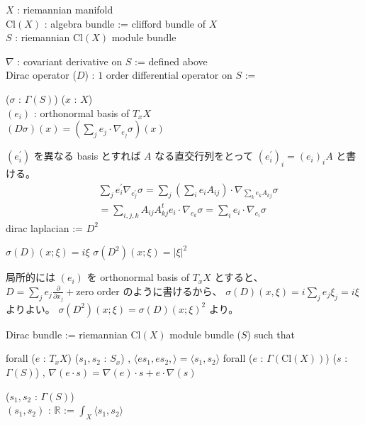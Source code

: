 \begin{When}
\itemwhen
  \Fix \(X\) : riemannian manifold \\
  \Let \(\text{Cl}(X)\) : algebra bundle := clifford bundle of \(X\) \\
  \Fix \(S\) : riemannian \(\text{Cl}(X)\) module bundle \\
\end{When}

\begin{Definition}
\itemdefi
  \Let \(\nabla\) : covariant derivative on \(S\) := defined above \\
  \Define Dirac operator (\(D\)) : \(1\) order differential operator on \(S\) :=
  \begin{indentblock}
    \For (\(\sigma\) : \(\Gamma(S)\)) (\(x\) : \(X\)) \\
    \Take \((e_i)\) : orthonormal basis of \(T_x X\) \\
    \Define \((D \sigma)(x) = (\sum_j e_j \cdot \nabla_{e_j} \sigma)(x)\)
  \end{indentblock}
\itemprof
  \((e^{\prime}_i)\) を異なる basis とすれば \(A\) なる直交行列をとって \((e^{\prime}_i)_i = (e_i)_i A\) と書ける。
  \begin{align*}
    & \sum_j e^{\prime}_i \nabla_{e^{\prime}_j} \sigma = \sum_j (\sum_i e_i A_{ij}) \cdot \nabla_{\sum_k e_k A_{kj}} \sigma \\
    &= \sum_{i,j,k} A_{ij} A^t_{kj} e_i \cdot \nabla_{e_k} \sigma = \sum_{i} e_i \cdot \nabla_{e_i} \sigma 
  \end{align*}
\itemdefi
  dirac laplacian := \(D^2\)
\end{Definition}

\begin{Theorem}
\itemprop
  \(\sigma(D)(x ; \xi) = i \xi\)
\itemprop
  \(\sigma(D^2)(x ; \xi) = \left| \xi \right| ^2\)
\end{Theorem}

\begin{Proof}
\itemprof
  局所的には \((e_i)\) を orthonormal basis of \(T_x X\) とすると、 \(D = \sum_j e_j \frac{\partial}{\partial x_j} + \text{zero order}\) のように書けるから、 \(\sigma(D)(x , \xi) = i \sum_j e_j \xi_j = i \xi\) よりよい。
\itemprof
  \(\sigma(D^2)(x ; \xi) = \sigma(D)(x ; \xi)^2\) より。
\end{Proof}

\begin{Definition}
\itemdefi
  Dirac bundle := riemannian \(\text{Cl}(X)\) module bundle (\(S\)) such that
  \begin{itemize}
    \itemenum forall (\(e\) : \(T_x X\)) (\(s_1 , s_2\) : \(S_x\)) , \(\langle e s_1 , e s_2 , \rangle = \langle s_1 , s_2 \rangle\)
    \itemenum forall (\(e\) : \(\Gamma(\text{Cl}(X))\)) (\(s\) : \(\Gamma(S)\)) , \(\nabla(e \cdot s) = \nabla(e) \cdot s + e \cdot \nabla(s)\)
  \end{itemize}
\itemdefi
  \For (\(s_1 , s_2\) : \(\Gamma(S)\)) \\
  \Define \((s_1 , s_2)\) : \(\mathbb{R}\) := \(\int_X \langle s_1 , s_2 \rangle\)
\end{Definition}

